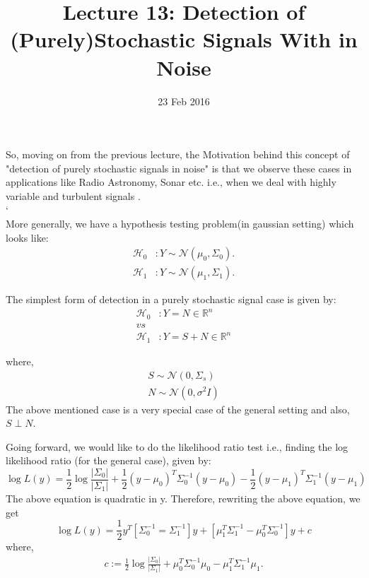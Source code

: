 \documentclass[a4paper,english,12pt]{article}
\title{Lecture 13: Detection of (Purely)Stochastic Signals With in Noise}
\date{23 Feb 2016}
\author{}
\begin{document}
\maketitle
So, moving on from the previous lecture, the Motivation behind this concept of "detection of purely stochastic signals in noise" is that we observe these cases in applications like Radio Astronomy, Sonar etc. i.e., when we deal with highly variable and turbulent signals  .\\

`\\ More generally, we have a hypothesis testing problem(in gaussian setting) which looks like:
\begin{align*}
\label{n1}
\mathcal{H}_0 &: Y \sim \mathcal{N}(\mu_0,\Sigma_0).\\
\mathcal{H}_1 &: Y \sim \mathcal{N}(\mu_1,\Sigma_1).
\end{align*}

The simplest form of detection in a purely stochastic signal case is given by:
\begin{align*}
\mathcal{H}_0 &: Y = N \in \mathbb{R}^n\\
vs\\
\mathcal{H}_1 &: Y = S+N \in \mathbb{R}^n 
\end{align*}

where,  
\begin{align*}  
S\sim \mathcal{N}(0,\Sigma_s)\\
N\sim \mathcal{N}(0,\sigma^2I)
\end{align*}
The above mentioned case is a very special case of the general setting and also, $S\perp N$.

Going forward, we would like to do the likelihood ratio test i.e., finding the log likelihood ratio (for the general case), given by:
\begin{equation*}
\log L(y)= \frac{1}{2}\log\frac{|\Sigma_0|}{|\Sigma_1|}+\frac{1}{2}(y-\mu_0)^T\Sigma_0^{-1}(y-\mu_0)-\frac{1}{2}(y-\mu_1)^T\Sigma_1^{-1}(y-\mu_1)
\end{equation*}
The above equation is quadratic in y.
Therefore, rewriting the above equation, we get
\begin{equation*}
\log L(y)=\frac{1}{2}y^T[\Sigma_0^{-1}=\Sigma_1^{-1}]y+[\mu_1^T\Sigma_1^{-1}-\mu_0^T\Sigma_0^{-1}]y+c
\end{equation*}
where,
\begin{align*}
c:=\frac{1}{2}\log\frac{|\Sigma_0|}{|\Sigma_1|}+\mu_0^T\Sigma_0^{-1}\mu_0-\mu_1^T\Sigma_1^{-1}\mu_1.
\end{align*}
\end{document}
